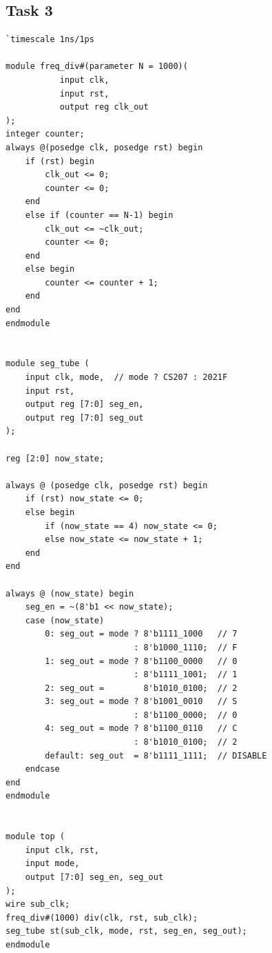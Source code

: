 \documentclass[onecolumn, oneside, ctexart]{SUSTechHomework}
\begin{document}
\subsection{Task 3}
\begin{lstlisting}[caption={Design File}]
`timescale 1ns/1ps

module freq_div#(parameter N = 1000)(
           input clk,
           input rst,
           output reg clk_out
);
integer counter;
always @(posedge clk, posedge rst) begin
    if (rst) begin
        clk_out <= 0;
        counter <= 0;
    end
    else if (counter == N-1) begin
        clk_out <= ~clk_out;
        counter <= 0;
    end
    else begin
        counter <= counter + 1;
    end
end
endmodule


module seg_tube (
    input clk, mode,  // mode ? CS207 : 2021F
    input rst,
    output reg [7:0] seg_en,
    output reg [7:0] seg_out
);

reg [2:0] now_state;

always @ (posedge clk, posedge rst) begin
    if (rst) now_state <= 0;
    else begin
        if (now_state == 4) now_state <= 0;
        else now_state <= now_state + 1;
    end
end

always @ (now_state) begin
    seg_en = ~(8'b1 << now_state);
    case (now_state)
        0: seg_out = mode ? 8'b1111_1000   // 7
                          : 8'b1000_1110;  // F
        1: seg_out = mode ? 8'b1100_0000   // 0
                          : 8'b1111_1001;  // 1
        2: seg_out =        8'b1010_0100;  // 2
        3: seg_out = mode ? 8'b1001_0010   // S
                          : 8'b1100_0000;  // 0
        4: seg_out = mode ? 8'b1100_0110   // C
                          : 8'b1010_0100;  // 2
        default: seg_out  = 8'b1111_1111;  // DISABLE
    endcase
end
endmodule


module top (
    input clk, rst,
    input mode,
    output [7:0] seg_en, seg_out
);
wire sub_clk;
freq_div#(1000) div(clk, rst, sub_clk);
seg_tube st(sub_clk, mode, rst, seg_en, seg_out);
endmodule
\end{lstlisting}
\end{document}
